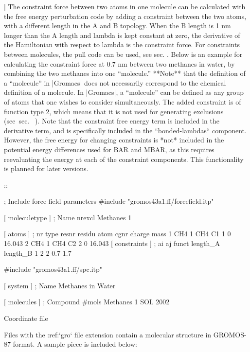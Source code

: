 | The constraint force between two atoms in one molecule can be
  calculated with the free energy perturbation code by adding a
  constraint between the two atoms, with a different length in the A and
  B topology. When the B length is 1 nm longer than the A length and
  lambda is kept constant at zero, the derivative of the Hamiltonian
  with respect to lambda is the constraint force. For constraints
  between molecules, the pull code can be used, see
  sec.
  . Below is an example for calculating
  the constraint force at 0.7 nm between two methanes in water, by
  combining the two methanes into one “molecule.” **Note** that the
  definition of a “molecule” in |Gromacs| does not necessarily correspond
  to the chemical definition of a molecule. In |Gromacs|, a “molecule” can
  be defined as any group of atoms that one wishes to consider
  simultaneously. The added constraint is of function type 2, which
  means that it is not used for generating exclusions
  (see sec. 
  ). Note that the constraint free
  energy term is included in the derivative term, and is specifically
  included in the ``bonded-lambdas`` component. However, the
  free energy for changing constraints is *not* included in the
  potential energy differences used for BAR and MBAR, as this requires
  reevaluating the energy at each of the constraint components. This
  functionality is planned for later versions.

::

    ; Include force-field parameters
    #include "gromos43a1.ff/forcefield.itp"

    [ moleculetype ]
    ; Name            nrexcl
    Methanes               1

    [ atoms ]
    ; nr   type   resnr  residu   atom    cgnr     charge    mass
       1    CH4     1     CH4      C1       1          0    16.043
       2    CH4     1     CH4      C2       2          0    16.043
    [ constraints ]
    ;  ai    aj funct   length_A  length_B
        1     2     2        0.7       1.7

    #include "gromos43a1.ff/spc.itp"

    [ system ]
    ; Name
    Methanes in Water

    [ molecules ]
    ; Compound        #mols
    Methanes              1
    SOL                2002

Coordinate file
~~~~~~~~~~~~~~~

Files with the :ref:`gro` file extension contain a molecular
structure in GROMOS-87 format. A sample piece is included below:

